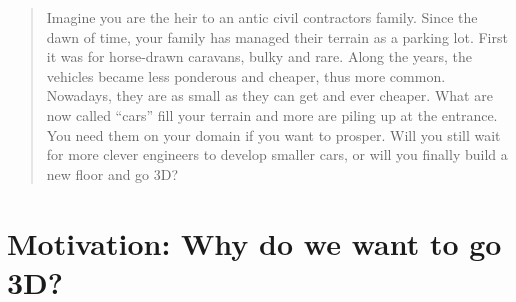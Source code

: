 \documentclass[11pt,a4paper]{report} %
\theoremstyle{customdef}
\begin{document}
\thispagestyle{empty}

\tableofcontents

\clearpage

\thispagestyle{empty}


\printglossaries

\clearpage

\thispagestyle{plain} %

\begin{quote}
Imagine you are the heir to an antic civil contractors family.
Since the dawn of time, your family has managed their terrain as a parking lot.
First it was for horse-drawn caravans, bulky and rare.
Along the years, the vehicles became less ponderous and cheaper, thus more common.
Nowadays, they are as small as they can get and ever cheaper.
What are now called “cars” fill your terrain and more are piling up at the entrance.
You need them on your domain if you want to prosper.
Will you still wait for more clever engineers to develop smaller cars, or will you finally build a new floor and go 3D?


\end{quote}






\chapter{Motivation: Why do we want to go 3D?}
\end{document}
